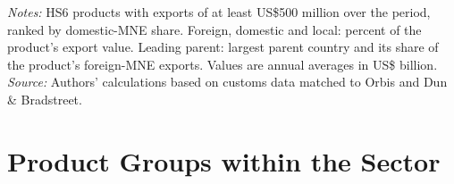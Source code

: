 \documentclass[11pt,a4paper]{article}
\begin{document}
\begin{table}[H]\centering\footnotesize%
  \caption{Other Goods: Products with the Highest Domestic-Multinational Share}%
  \label{tab:hs_by_domestic_share_rest}%
  \par\vspace{3pt}%
  \begin{minipage}{0.95\textwidth}\footnotesize %
  \textit{Notes:} HS6 products with exports of at least US\$500 million over the period, ranked by domestic-MNE share. Foreign, domestic and local: percent of the product's export value. Leading parent: largest parent country and its share of the product's foreign-MNE exports. Values are annual averages in US\$ billion.\\[3pt]%
  \textit{Source:} Authors' calculations based on customs data matched to Orbis and Dun \& Bradstreet.%
  \end{minipage}%
  \end{table}

\section{Product Groups within the Sector}\label{sec:sub_rest}
\end{document}

